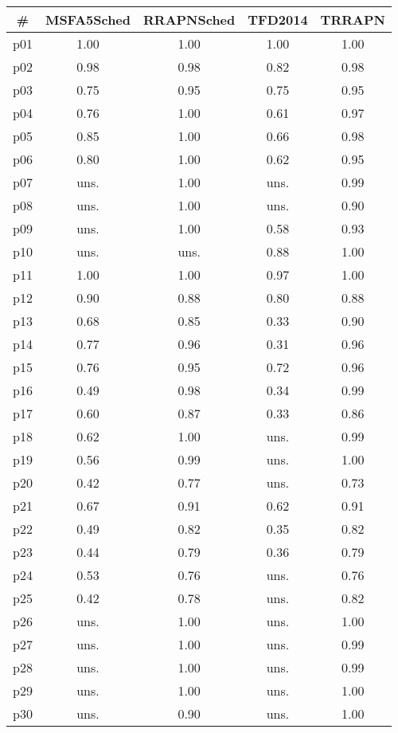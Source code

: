 \begin{tabular}{ccccc}
\toprule
\textbf{\#} & \textbf{MSFA5Sched} & \textbf{RRAPNSched} & \textbf{TFD2014} & \textbf{TRRAPN}\\
\midrule
p01 & 1.00 & 1.00 & 1.00 & 1.00\\
p02 & 0.98 & 0.98 & 0.82 & 0.98\\
p03 & 0.75 & 0.95 & 0.75 & 0.95\\
p04 & 0.76 & 1.00 & 0.61 & 0.97\\
p05 & 0.85 & 1.00 & 0.66 & 0.98\\
p06 & 0.80 & 1.00 & 0.62 & 0.95\\
p07 & uns. & 1.00 & uns. & 0.99\\
p08 & uns. & 1.00 & uns. & 0.90\\
p09 & uns. & 1.00 & 0.58 & 0.93\\
p10 & uns. & uns. & 0.88 & 1.00\\
p11 & 1.00 & 1.00 & 0.97 & 1.00\\
p12 & 0.90 & 0.88 & 0.80 & 0.88\\
p13 & 0.68 & 0.85 & 0.33 & 0.90\\
p14 & 0.77 & 0.96 & 0.31 & 0.96\\
p15 & 0.76 & 0.95 & 0.72 & 0.96\\
p16 & 0.49 & 0.98 & 0.34 & 0.99\\
p17 & 0.60 & 0.87 & 0.33 & 0.86\\
p18 & 0.62 & 1.00 & uns. & 0.99\\
p19 & 0.56 & 0.99 & uns. & 1.00\\
p20 & 0.42 & 0.77 & uns. & 0.73\\
p21 & 0.67 & 0.91 & 0.62 & 0.91\\
p22 & 0.49 & 0.82 & 0.35 & 0.82\\
p23 & 0.44 & 0.79 & 0.36 & 0.79\\
p24 & 0.53 & 0.76 & uns. & 0.76\\
p25 & 0.42 & 0.78 & uns. & 0.82\\
p26 & uns. & 1.00 & uns. & 1.00\\
p27 & uns. & 1.00 & uns. & 0.99\\
p28 & uns. & 1.00 & uns. & 0.99\\
p29 & uns. & 1.00 & uns. & 1.00\\
p30 & uns. & 0.90 & uns. & 1.00\\
\bottomrule
\end{tabular}

